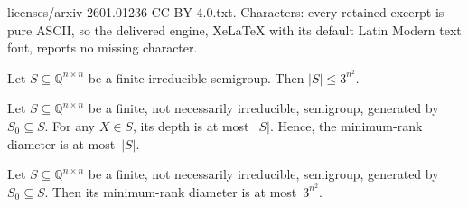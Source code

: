 \documentclass[10pt,a4paper]{amsart}
\newcommand{\Q}{\mathbb{Q}}
\begin{document}
licenses/arxiv-2601.01236-CC-BY-4.0.txt. Characters: every retained excerpt is pure ASCII, so the delivered engine, XeLaTeX with its default Latin Modern text font, reports no missing character.
\begin{theorem}\label{thm:main-bound}
Let $S \subseteq \Q^{n \times n}$ be a finite irreducible semigroup. Then $|S| \le 3^{n^2}$.
\end{theorem}

\begin{proposition} \label{prop:diameter-size-bound}
Let $S \subseteq \Q^{n \times n}$ be a finite, not necessarily irreducible, semigroup, generated by $S_0 \subseteq S$.
For any $X \in S$, its depth is at most~$|S|$.
Hence, the minimum-rank diameter is at most~$|S|$.
\end{proposition}

\begin{proposition} \label{prop:min-rank-diameter}
Let $S \subseteq \Q^{n \times n}$ be a finite, not necessarily irreducible, semigroup, generated by $S_0 \subseteq S$.
Then its minimum-rank diameter is at most~$3^{n^2}$.
\end{proposition}
\end{document}
